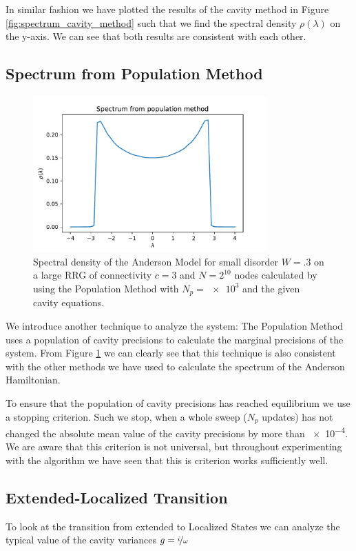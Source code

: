 \documentclass[../main.tex]{subfiles}
\begin{document}
In similar fashion we have plotted the results of the cavity method in Figure \ref{fig:spectrum_cavity_method} such that we find the spectral density $\rho(\lambda)$ on the y-axis.
We can see that both results are consistent with each other.


\subsection{Spectrum from Population Method}

\begin{figure}[htpb]
    \centering
    \includegraphics[width=0.8\textwidth]{../figures/ex3_spectrum_population.pdf}
    \caption{Spectral density of the Anderson Model for small disorder $W = \num{.3}$ on a large RRG of connectivity $c=3$ and $ N = 2^{10}$ nodes calculated by using the Population Method with $N_p = \num{e3}$ and the given cavity equations.}
    \label{fig:spectrum_population_method}
\end{figure}

We introduce another technique to analyze the system:
The Population Method uses a population of cavity precisions to calculate the marginal precisions of the system.
From Figure \ref{fig:spectrum_population_method} we can clearly see that this technique is also consistent with the other methods we have used to calculate the spectrum of the Anderson Hamiltonian.
\par

To ensure that the population of cavity precisions has reached equilibrium we use a stopping criterion.
Such we stop, when a whole sweep ($N_p$ updates) has not changed the absolute mean value of the cavity precisions by more than \num{e-4}.
We are aware that this criterion is not universal, but throughout experimenting with the algorithm we have seen that this is criterion works sufficiently well.


\subsection{Extended-Localized Transition}

To look at the transition from extended to Localized States we can analyze the typical value of the cavity variances $g = \nicefrac{i}{\omega}$



\ifSubfilesClassLoaded{
}{
    \newpage
}
\end{document}
